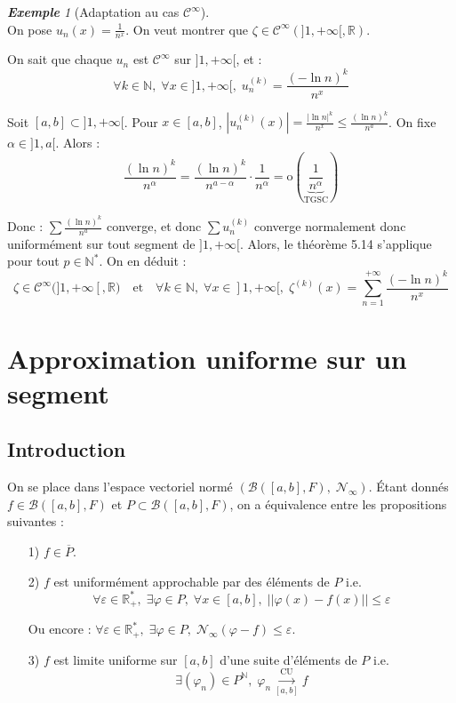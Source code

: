 \documentclass[12pt]{book}
\let\ensembleNombre\mathbb
\newcommand*\N{\ensuremath{\ensembleNombre{N}}}
\newcommand*\R{\ensuremath{\ensembleNombre{R}}}
\newcommand*\B{\ensuremath{\mathcal B}}
\newcommand{\lu}[1]{\ensuremath{\overset{\mathrm{CU}}{\underset{#1}{\longrightarrow}}}}
\theoremstyle{definition}
\theoremstyle{remark}
\newtheorem*{ex}{\textbf{Exemple}}
\begin{document}
	\begin{ex}[Adaptation au cas $\mathcal C^{\infty}$]\mbox{~}\\
	On pose $u_n(x) = \frac{1}{n^x}$. On veut montrer que $\zeta \in \mathcal C^{\infty}(]1, +\infty[, \R)$.
	
	On sait que chaque $u_n$ est $\mathcal C^\infty$ sur $]1, +\infty[$, et :
	\[\forall k \in \N,\; \forall x \in ]1, +\infty[, \; u_n^{(k)} = \frac{(-\ln n)^k}{n^x}\]
	
	Soit $[a,b] \subset ]1,+\infty[$. Pour $x \in [a,b]$, $|u_n^{(k)}(x)| = \frac{|\ln n|^k}{n^x} \leq \frac{(\ln n)^k}{n^a}$. On fixe $\alpha \in ]1, a[$. Alors :
	\[\frac{(\ln n)^k}{n^\alpha} = \frac{(\ln n)^k}{n^{a - \alpha}} \cdot \frac{1}{n^\alpha} = \mathrm o\left(\underbrace{\frac{1}{n^\alpha}}_{\text{TGSC}} \right)\]
	
	Donc : $\sum \frac{(\ln n)^k}{n^a}$ converge, et donc $\sum u_n^{(k)}$ converge normalement donc uniformément sur tout segment de $]1, +\infty[$. Alors, le théorème 5.14 s'applique pour tout $p \in \N^*$. On en déduit :
	\[ \zeta \in \mathcal C^{\infty}(]1, +\infty[, \R) \quad\text{et}\quad \forall k \in \N,\; \forall x \in ]1, +\infty[,\; \zeta^{(k)}(x) = \sum_{n=1}^{+\infty} \frac{(-\ln n)^k}{n^x} \]
	\end{ex}
	
	\section{Approximation uniforme sur un segment}
		\subsection{Introduction}
	On se place dans l'espace vectoriel normé $(\B([a,b], F), \; \mathcal N_\infty)$. Étant donnés $f \in \B([a,b], F)$ et $P \subset \B([a,b], F)$, on a équivalence entre les propositions suivantes :
	
	\begin{itemize}
	\item[1)] $f \in \overline P$.
	\item[2)] $f$ est uniformément approchable par des éléments de $P$ i.e. 
	\[\forall \varepsilon \in \R_+^*,\; \exists \varphi \in P, \; \forall x \in [a,b], \; ||\varphi(x) - f(x) || \leq \varepsilon\]
	
	Ou encore : $\forall \varepsilon \in \R_+^*,\; \exists \varphi \in P,\; \mathcal N_\infty (\varphi - f) \leq \varepsilon$.
	\item[3)] $f$ est limite uniforme sur $[a,b]$ d'une suite d'éléments de $P$ i.e.
	\[\exists (\varphi_n) \in P^\N,\; \varphi_n \lu{[a,b]} f\]
	\end{itemize}
	
\end{document}
